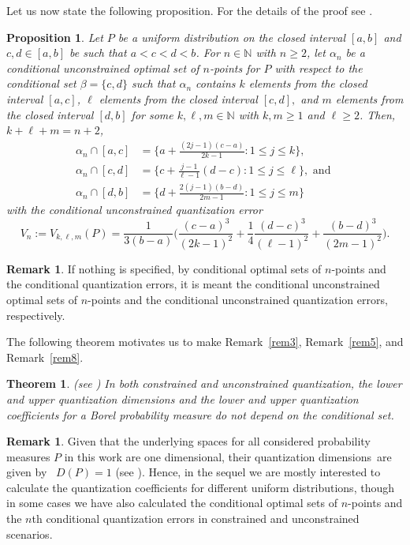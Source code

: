 \documentclass[12pt, reqno]{amsart}
\theoremstyle{plain}
\newtheorem{theorem}[subsection]{Theorem}
\newtheorem{prop}[subsection]{Proposition}
\theoremstyle{definition}
\newtheorem{remark}[subsection]{Remark}
\newcommand{\ii}{\cap}%
\newcommand{\set}[1]{\{#1\}}%
\newcommand{\ga}{\alpha}
\newcommand{\gb}{\beta}
\newcommand{\D}[1]{\mathbb{#1}}%
\newcommand{\te}{\text}%
\begin{document}
 Let us now state the following proposition. For the details of the proof see \cite{BCDR}. 
\begin{prop}\emph{\cite{BCDR}} \label{prop0} 
Let $P$ be a uniform distribution on the closed interval $[a, b]$ and $c, d\in [a, b]$ be such that $a<c<d<b$. For $n\in \D N$ with $n\geq 2$, let $\ga_n$ be a conditional unconstrained optimal set of $n$-points for $P$ with respect to the conditional set $\gb=\set{c, d}$ such that $\ga_n$ contains $k$ elements from the closed interval $[a, c]$, $\ell$ elements from the closed interval $[c, d],$ and $m$ elements from the closed interval $[d, b]$ for some $k,\ell,  m\in \D N$ with $k, m\geq 1$ and $\ell\geq 2$. Then, $k+\ell+m=n+2$,
\begin{align*} \ga_n\ii [a, c]&= \Big\{a+\frac{(2j-1)(c-a)}{2k-1} : 1\leq j\leq k\Big\}, \\
 \ga_n\ii[c, d]&=\Big\{c+\frac{j-1}{\ell-1}(d-c) : 1\leq j\leq \ell\Big\},  \te{ and } \\
 \ga_n\ii [d, b]&=\Big\{d+\frac{2(j-1)(b-d)}{2m-1} : 1\leq j\leq m\Big\} 
 \end{align*} 
with the conditional unconstrained quantization error 
 \[V_n:=V_{k,\ell, m}(P)= \frac  1 {3(b-a)}\Big(\frac{(c-a)^3}{(2k-1)^2}+\frac 1 {4}\frac {(d-c)^3}{ (\ell-1)^2}+\frac{(b-d)^3}{(2m-1)^2}\Big).\]
 \end{prop}
 
 \begin{remark}
If nothing is specified, by conditional optimal sets of $n$-points and the conditional quantization errors, it is meant the conditional unconstrained optimal sets of $n$-points and the conditional unconstrained quantization errors, respectively. 
 \end{remark} 
The following theorem motivates us to make Remark~\ref{rem3}, Remark~\ref{rem5}, and Remark~\ref{rem8}. 
 \begin{theorem} \emph{(see \cite{PR4})} \label{TheoM1} 
In both constrained and unconstrained quantization, the lower and upper quantization dimensions and the lower and upper quantization coefficients for a Borel probability measure do not depend on the conditional set. 
\end{theorem} 


\begin{remark}
Given that the underlying spaces for all considered probability measures $P$ in this work are one dimensional, their quantization dimensions are given by  $D(P)=1$ (see \cite{BW}).
Hence, in the sequel we are mostly interested to calculate the quantization coefficients for different uniform distributions, though in some cases we have also calculated the conditional optimal sets of $n$-points and the $n$th conditional quantization errors in constrained and unconstrained scenarios. 
\end{remark}
 
\end{document}

